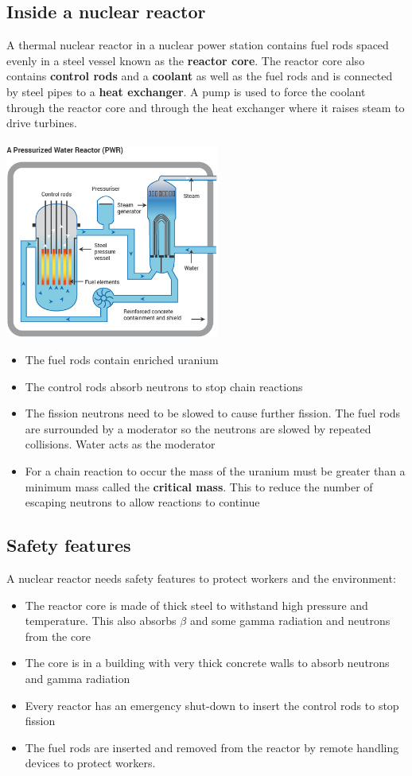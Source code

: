 \documentclass{article}[18pt]
\begin{document}
\subsection{Inside a nuclear reactor}
A thermal nuclear reactor in a nuclear power station contains fuel rods spaced evenly in a steel vessel known as the \textbf{reactor core}. The reactor core also contains \textbf{control rods} and a \textbf{coolant} as well as the fuel rods and is connected by steel pipes to a \textbf{heat exchanger}. A pump is used to force the coolant through the reactor core and through the heat exchanger where it raises steam to drive turbines.\\
\\
\includegraphics[width=7cm]{reactor.png}
\begin{itemize}
\item The fuel rods contain enriched uranium
\item The control rods absorb neutrons to stop chain reactions
\item The fission neutrons need to be slowed to cause further fission. The fuel rods are surrounded by a moderator so the neutrons are slowed by repeated collisions. Water acts as the moderator
\item For a chain reaction to occur the mass of the uranium must be greater than a minimum mass called the \textbf{critical mass}. This to reduce the number of escaping neutrons to allow reactions to continue
\end{itemize}
\subsection{Safety features}
A nuclear reactor needs safety features to protect workers and the environment:
\begin{itemize}
\item The reactor core is made of thick steel to withstand high pressure and temperature. This also absorbs $\beta$ and some gamma radiation and neutrons from the core
\item The core is in a building with very thick concrete walls to absorb neutrons and gamma radiation
\item Every reactor has an emergency shut-down to insert the control rods to stop fission
\item The fuel rods are inserted and removed from the reactor by remote handling devices to protect workers.
\end{itemize}
\end{document}
